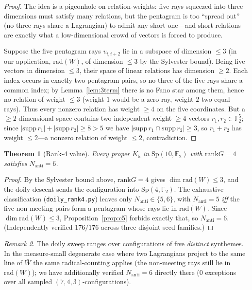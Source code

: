 \documentclass[11pt,a4paper]{article}
\newtheorem{theorem}{Theorem}[section]
\theoremstyle{remark}
\newtheorem{remark}[theorem]{Remark}
\newcommand{\Sp}{\mathrm{Sp}}
\newcommand{\rad}{\mathrm{rad}}
\newcommand{\rank}{\mathrm{rank}}
\newcommand{\Nanti}{N_{\mathrm{anti}}}
\begin{document}
\begin{proof}
The idea is a pigeonhole on relation-weights: five rays squeezed into three dimensions
must satisfy many relations, but the pentagram is too ``spread out'' (no three rays
share a Lagrangian) to admit any short one---and short relations are exactly what a
low-dimensional crowd of vectors is forced to produce.

Suppose the five pentagram rays $v_{i,i+2}$ lie in a subspace of dimension $\le3$ (in
our application, $\rad(W)$, of dimension $\le3$ by the Sylvester bound). Being five
vectors in dimension $\le3$, their space of linear relations has dimension $\ge2$. Each index occurs in exactly two
pentagram pairs, so no three of the five rays share a common index; by
Lemma~\ref{lem:3term} there is no Fano star among them, hence no relation of weight
$\le3$ (weight $1$ would be a zero ray, weight $2$ two equal rays). Thus every
nonzero relation has weight $\ge4$ on the five coordinates. But a $\ge2$-dimensional
space contains two independent weight-$\ge4$ vectors $r_1,r_2\in\mathbb F_2^5$; since
$|\mathrm{supp}\,r_1|+|\mathrm{supp}\,r_2|\ge8>5$ we have
$|\mathrm{supp}\,r_1\cap\mathrm{supp}\,r_2|\ge3$, so $r_1+r_2$ has weight $\le2$---a
nonzero relation of weight $\le2$, contradiction.
\end{proof}

\begin{theorem}[Rank-4 value]\label{thm:rank4}
Every proper $K_5$ in $\Sp(10,\mathbb F_2)$ with $\rank G=4$ satisfies $\Nanti=6$.
\end{theorem}

\begin{proof}
By the Sylvester bound above, $\rank G=4$ gives $\dim\rad(W)\le3$, and the doily
descent sends the configuration into $\Sp(4,\mathbb F_2)$. The exhaustive
classification (\texttt{doily\_rank4.py}) leaves only $\Nanti\in\{5,6\}$, with
$\Nanti=5$ \emph{iff} the five non-meeting pairs form a pentagram whose rays lie in
$\rad(W)$. Since $\dim\rad(W)\le3$, Proposition~\ref{prop:c5} forbids exactly that, so
$\Nanti=6$. (Independently verified $176/176$ across three disjoint seed families.)
\end{proof}

\begin{remark}
The doily sweep ranges over configurations of five \emph{distinct} synthemes. In the
measure-small degenerate case where two Lagrangians project to the same line of
$\bar W$ the same radical-counting applies (the non-meeting rays still lie in
$\rad(W)$); we have additionally verified $\Nanti=6$ directly there ($0$ exceptions
over all sampled $(7,4,3)$-configurations).
\end{remark}
\end{document}
